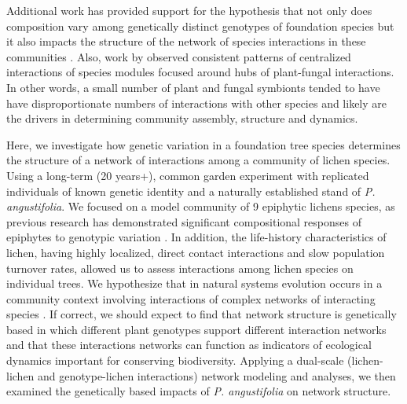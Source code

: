 \documentclass[9pt,twocolumn,twoside,lineno]{pnas-new}
\begin{document}
Additional work has provided support for the hypothesis that not only
does composition vary among genetically distinct genotypes of
foundation species but it also impacts the structure of the network of
species interactions in these communities \cite{Keith2017,
  Lau2016}. Also, work by \citep{Toju 2018, Toju2015, Toju2014}
observed consistent patterns of centralized interactions of species
modules focused around hubs of plant-fungal interactions. In other
words, a small number of plant and fungal symbionts tended to have
have disproportionate numbers of interactions with other species and
likely are the drivers in determining community assembly, structure
and dynamics.

Here, we investigate how genetic variation in a foundation tree
species determines the structure of a network of interactions among a
community of lichen species. Using a long-term (20 years+), common
garden experiment with replicated individuals of known genetic
identity and a naturally established stand of
\textit{P. angustifolia}. We focused on a model community of 9
epiphytic lichens species, as previous research has demonstrated
significant compositional responses of epiphytes to genotypic
variation \cite{Winfree2011, Zytynska2011}. In addition, the
life-history characteristics of lichen, having highly localized,
direct contact interactions and slow population turnover rates,
allowed us to assess interactions among lichen species on individual
trees. We hypothesize that in natural systems evolution occurs in a
community context involving interactions of complex networks of
interacting species \cite{Lau2016, Keith2017, Thompson2013,
  Bascompte2007, Darwin1855}.  If correct, we should expect to find
that network structure is genetically based in which different plant
genotypes support different interaction networks and that these
interactions networks can function as indicators of ecological
dynamics important for conserving biodiversity.  Applying a dual-scale
(lichen-lichen and genotype-lichen interactions) network modeling and
analyses, we then examined the genetically based impacts of
\textit{P. angustifolia} on network structure.
\end{document}

